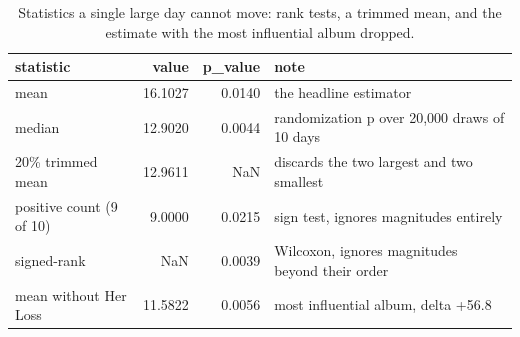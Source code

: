 \begin{table}
\caption{Statistics a single large day cannot move: rank tests, a trimmed mean, and the estimate with the most influential album dropped.}
\begin{tabular}{lrrl}
\toprule
statistic & value & p\_value & note \\
\midrule
mean & 16.1027 & 0.0140 & the headline estimator \\
median & 12.9020 & 0.0044 & randomization p over 20,000 draws of 10 days \\
20\% trimmed mean & 12.9611 & NaN & discards the two largest and two smallest \\
positive count (9 of 10) & 9.0000 & 0.0215 & sign test, ignores magnitudes entirely \\
signed-rank & NaN & 0.0039 & Wilcoxon, ignores magnitudes beyond their order \\
mean without Her Loss & 11.5822 & 0.0056 & most influential album, delta +56.8 \\
\bottomrule
\end{tabular}
\end{table}
